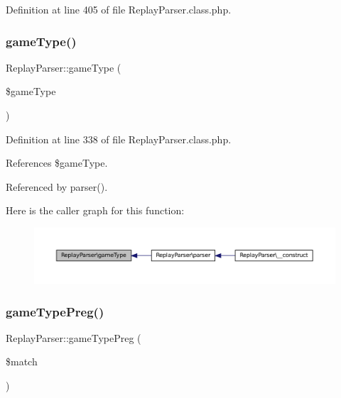 Definition at line 405 of file Replay\+Parser.\+class.\+php.

\mbox{\label{class_replay_parser_a0e77a5f3424e6755f45c77fb7e0a67d8}} 
\subsubsection{\texorpdfstring{game\+Type()}{gameType()}}
{\footnotesize\ttfamily Replay\+Parser\+::game\+Type (\begin{DoxyParamCaption}\item[{}]{\$game\+Type }\end{DoxyParamCaption})}



Definition at line 338 of file Replay\+Parser.\+class.\+php.



References \$game\+Type.



Referenced by parser().

Here is the caller graph for this function\+:\nopagebreak
\begin{figure}[H]
\begin{center}
\leavevmode
\includegraphics[width=350pt]{class_replay_parser_a0e77a5f3424e6755f45c77fb7e0a67d8_icgraph}
\end{center}
\end{figure}
\mbox{\label{class_replay_parser_abbcd249f3c369dc35386fc203bd7dc74}} 
\subsubsection{\texorpdfstring{game\+Type\+Preg()}{gameTypePreg()}}
{\footnotesize\ttfamily Replay\+Parser\+::game\+Type\+Preg (\begin{DoxyParamCaption}\item[{}]{\$match }\end{DoxyParamCaption})}



